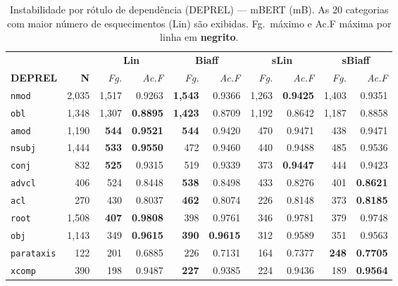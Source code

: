 \clearpage
\begin{table}[p]
\centering
\caption{Instabilidade por r\'otulo de depend\^encia (DEPREL) --- mBERT (mB).
As 20 categorias com maior n\'umero de esquecimentos (Lin) s\~ao exibidas.
Fg.\ m\'aximo e Ac.F m\'axima por linha em \textbf{negrito}.}
\label{tab:instab-mb-deprel}
\begingroup
\scriptsize\setlength{\tabcolsep}{2pt}\renewcommand{\arraystretch}{1.25}%
\begin{tabular}{l r| r r| r r| r r| r r}
\toprule
\multicolumn{2}{c|}{}
  & \multicolumn{2}{c|}{\textbf{Lin}}
  & \multicolumn{2}{c|}{\textbf{Biaff}}
  & \multicolumn{2}{c|}{\textbf{sLin}}
  & \multicolumn{2}{c}{\textbf{sBiaff}} \\
\textbf{DEPREL} & \textbf{N}
  & \textit{Fg.} & \textit{Ac.F}
  & \textit{Fg.} & \textit{Ac.F}
  & \textit{Fg.} & \textit{Ac.F}
  & \textit{Fg.} & \textit{Ac.F} \\
\cmidrule(lr){3-4}\cmidrule(lr){5-6}\cmidrule(lr){7-8}\cmidrule(lr){9-10}
  \texttt{nmod} & 2,035 & 1,517 & 0.9263 & \textbf{1,543} & 0.9366 & 1,263 & \textbf{0.9425} & 1,403 & 0.9351 \\
  \texttt{obl} & 1,348 & 1,307 & \textbf{0.8895} & \textbf{1,423} & 0.8709 & 1,192 & 0.8642 & 1,187 & 0.8858 \\
  \texttt{amod} & 1,190 & \textbf{544} & \textbf{0.9521} & \textbf{544} & 0.9420 & 470 & 0.9471 & 438 & 0.9471 \\
  \texttt{nsubj} & 1,444 & \textbf{533} & \textbf{0.9550} & 472 & 0.9460 & 440 & 0.9488 & 485 & 0.9536 \\
  \texttt{conj} & 832 & \textbf{525} & 0.9315 & 519 & 0.9339 & 373 & \textbf{0.9447} & 444 & 0.9423 \\
  \texttt{advcl} & 406 & 524 & 0.8448 & \textbf{538} & 0.8498 & 433 & 0.8276 & 401 & \textbf{0.8621} \\
  \texttt{acl} & 270 & 430 & 0.8037 & \textbf{462} & 0.8074 & 226 & 0.8148 & 373 & \textbf{0.8185} \\
  \texttt{root} & 1,508 & \textbf{407} & \textbf{0.9808} & 398 & 0.9761 & 346 & 0.9781 & 379 & 0.9748 \\
  \texttt{obj} & 1,143 & 349 & \textbf{0.9615} & \textbf{390} & \textbf{0.9615} & 312 & 0.9589 & 351 & 0.9563 \\
  \texttt{parataxis} & 122 & 201 & 0.6885 & 226 & 0.7131 & 164 & 0.7377 & \textbf{248} & \textbf{0.7705} \\
  \texttt{xcomp} & 390 & 198 & 0.9487 & \textbf{227} & 0.9385 & 224 & 0.9436 & 189 & \textbf{0.9564} \\

\end{tabular}
\end{table}
